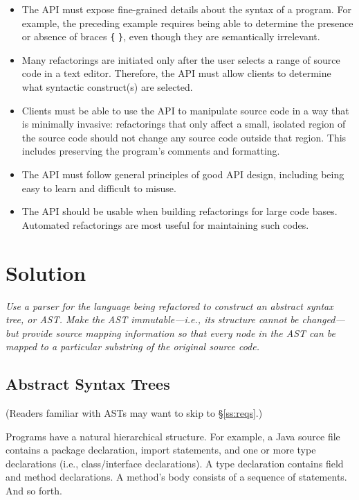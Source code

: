 \documentclass[prodmode]{acmlarge}
\newcommand{\ttt}[1]{\texttt{#1}}
\begin{document}
\begin{itemize}

\item The API must expose fine-grained details about the syntax of a program.
For example, the preceding example requires being able to determine the
presence or absence of braces \ttt{\{} \ttt{\}}, even though they are
semantically irrelevant.

\item Many refactorings are initiated only after the user selects a range of
source code in a text editor.  Therefore, the API must allow clients to
determine what syntactic construct(s) are selected.

\item Clients must be able to use the API to manipulate source code in a way
that is minimally invasive: refactorings that only affect a small, isolated
region of the source code should not change any source code outside that
region.  This includes preserving the program's comments and formatting.

\item The API must follow general principles of good API design, including
being easy to learn and difficult to misuse.

\item The API should be usable when building refactorings for large code bases.
Automated refactorings are most useful for maintaining such codes.

\end{itemize}

\section{Solution}

\textit{Use a parser for the language being refactored to construct an
\textup{abstract syntax tree}, or \textup{AST}.  Make the AST
\textup{immutable}---i.e., its structure cannot be changed---but provide
\textup{source mapping} information so that every node in the AST can be mapped
to a particular substring of the original source code.}

\subsection{Abstract Syntax Trees}
\label{ss:asts}

(Readers familiar with ASTs may want to skip to \S\ref{ss:reqs}.)

Programs have a natural hierarchical structure.  For example, a Java source
file contains a package declaration, import statements, and one or more type
declarations (i.e., class/interface declarations).  A type declaration contains
field and method declarations.  A method's body consists of a sequence of
statements.  And so forth.
\end{document}
